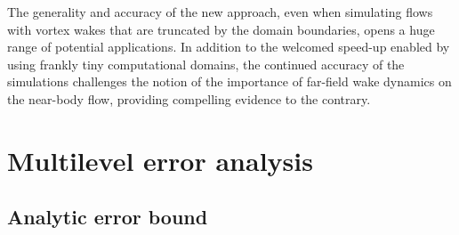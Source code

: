 \documentclass[final,1p,times]{elsarticle}
\begin{document}
The generality and accuracy of the new approach, even when simulating flows with vortex wakes that are truncated by the domain boundaries, opens a huge range of potential applications. In addition to the welcomed speed-up enabled by using frankly tiny computational domains, the continued accuracy of the simulations challenges the notion of the importance of far-field wake dynamics on the near-body flow, providing compelling evidence to the contrary.



\appendix

\section{Multilevel error analysis}\label{A0}

\subsection{Analytic error bound}
\end{document}

